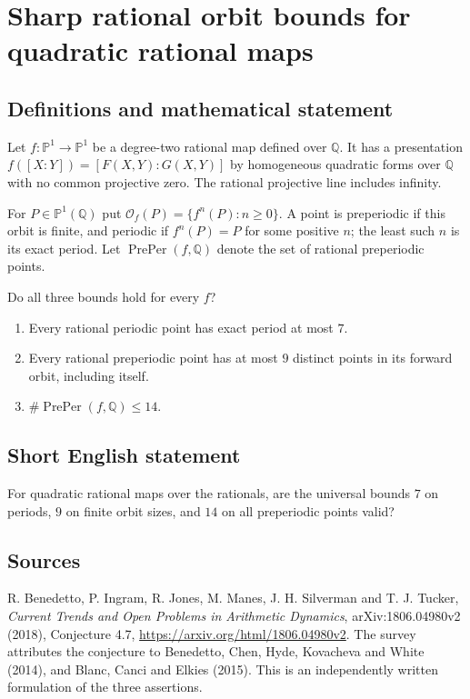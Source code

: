 \documentclass{article}
\begin{document}
\section*{Sharp rational orbit bounds for quadratic rational maps}
\subsection{Definitions and mathematical statement}
Let $f:\mathbb P^1\to\mathbb P^1$ be a degree-two rational map defined over
$\mathbb Q$. It has a presentation $f([X:Y])=[F(X,Y):G(X,Y)]$ by homogeneous
quadratic forms over $\mathbb Q$ with no common projective zero.
The rational projective line includes infinity.

For $P\in\mathbb P^1(\mathbb Q)$ put
$\mathcal O_f(P)=\{f^n(P):n\geq0\}$. A point is preperiodic if this orbit
is finite, and periodic if $f^n(P)=P$ for some positive $n$; the least such
$n$ is its exact period. Let $\operatorname{PrePer}(f,\mathbb Q)$ denote
the set of rational preperiodic points.

Do all three bounds hold for every $f$?
\begin{enumerate}
\item Every rational periodic point has exact period at most $7$.
\item Every rational preperiodic point has at most $9$ distinct points in its
forward orbit, including itself.
\item $\#\operatorname{PrePer}(f,\mathbb Q)\leq14$.
\end{enumerate}

\subsection{Short English statement}
For quadratic rational maps over the rationals, are the universal bounds
$7$ on periods, $9$ on finite orbit sizes, and $14$ on all preperiodic points
valid?

\subsection{Sources}
R. Benedetto, P. Ingram, R. Jones, M. Manes, J. H. Silverman
and T. J. Tucker, \emph{Current Trends and Open Problems in Arithmetic
Dynamics}, arXiv:1806.04980v2 (2018), Conjecture 4.7,
\url{https://arxiv.org/html/1806.04980v2}.
The survey attributes the conjecture to Benedetto, Chen, Hyde, Kovacheva
and White (2014), and Blanc, Canci and Elkies (2015).
This is an independently written formulation of the three assertions.
\end{document}
